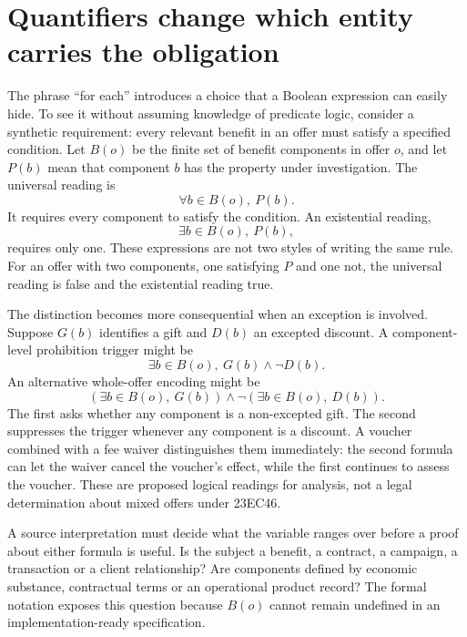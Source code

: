 \documentclass[12pt,a4paper,oneside,openany]{book}
\begin{document}
\section{Quantifiers change which entity carries the obligation}

The phrase ``for each'' introduces a choice that a Boolean expression can easily
hide. To see it without assuming knowledge of predicate logic, consider a
synthetic requirement: every relevant benefit in an offer must satisfy a specified
condition. Let $B(o)$ be the finite set of benefit components in offer $o$, and
let $P(b)$ mean that component $b$ has the property under investigation. The
universal reading is
\begin{equation}
 \forall b\in B(o),\ P(b).
 \label{eq:universal-benefit}
\end{equation}
It requires every component to satisfy the condition. An existential reading,
\begin{equation}
 \exists b\in B(o),\ P(b),
 \label{eq:existential-benefit}
\end{equation}
requires only one. These expressions are not two styles of writing the same rule.
For an offer with two components, one satisfying $P$ and one not, the universal
reading is false and the existential reading true.

The distinction becomes more consequential when an exception is involved. Suppose
$G(b)$ identifies a gift and $D(b)$ an excepted discount. A component-level
prohibition trigger might be
\begin{equation}
 \exists b\in B(o),\ G(b)\land\neg D(b).
 \label{eq:component-exception}
\end{equation}
An alternative whole-offer encoding might be
\begin{equation}
 \left(\exists b\in B(o),\ G(b)\right)
 \land\neg\left(\exists b\in B(o),\ D(b)\right).
 \label{eq:offer-exception}
\end{equation}
The first asks whether any component is a non-excepted gift. The second suppresses
the trigger whenever any component is a discount. A voucher combined with a fee
waiver distinguishes them immediately: the second formula can let the waiver
cancel the voucher's effect, while the first continues to assess the voucher.
These are proposed logical readings for analysis, not a legal determination about
mixed offers under 23EC46.

A source interpretation must decide what the variable ranges over before a proof
about either formula is useful. Is the subject a benefit, a contract, a campaign,
a transaction or a client relationship? Are components defined by economic
substance, contractual terms or an operational product record? The formal
notation exposes this question because $B(o)$ cannot remain undefined in an
implementation-ready specification.
\end{document}
